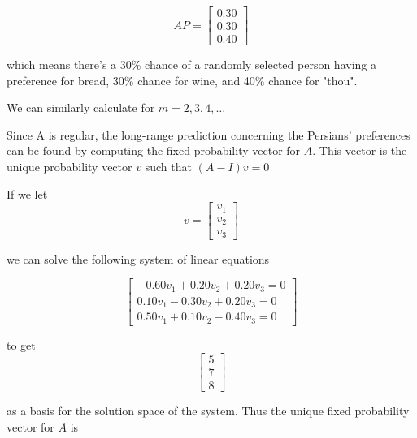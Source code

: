 \documentclass{amsart}
\theoremstyle{definition}
\theoremstyle{remark}
\numberwithin{equation}{section}
\begin{document}
\begin{equation}
    AP = \begin{bmatrix}
           0.30 \\
           0.30 \\
           0.40
         \end{bmatrix}
\end{equation}

which means there's a 30\% chance of a randomly selected person having a preference for bread, 30\% chance for wine, and 40\% chance for "thou".

We can similarly calculate for $m = 2, 3, 4, \ldots $

Since A is regular, the long-range prediction concerning the Persians' preferences can be found by computing the fixed probability vector for $A$.
This vector is the unique probability vector $v$ such that $(A - I)v = 0$

If we let
\begin{equation}
    v = \begin{bmatrix}
           v_1 \\
           v_2 \\
           v_3


         \end{bmatrix}
\end{equation}

we can solve the following system of linear equations

\begin{equation}
    \begin{bmatrix}
           -0.60v_1 + 0.20v_2 + 0.20v_3  = 0 \\
           0.10v_1 - 0.30v_2 + 0.20v_3 = 0\\
           0.50v_1 + 0.10v_2 - 0.40v_3 = 0
         \end{bmatrix}
\end{equation}

 to get
\begin{equation}
    \begin{bmatrix}
           5 \\
           7 \\
           8


         \end{bmatrix}
\end{equation}

as a basis for the solution space of the system.
Thus the unique fixed probability vector for $A$ is
\end{document}
